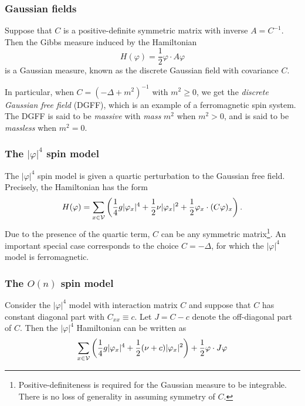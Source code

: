 \subsubsection{Gaussian fields}

Suppose that $C$ is a positive-definite symmetric matrix with inverse $A = C^{-1}$.
Then the Gibbs measure induced by the Hamiltonian
\begin{equation}
H(\varphi) = \frac{1}{2} \varphi \cdot A \varphi
\end{equation}
is a Gaussian measure, known as the discrete Gaussian field with covariance $C$.

In particular, when $C = (-\Delta + m^2)^{-1}$ with $m^2 \ge 0$, we get the \emph{discrete Gaussian
free field} (DGFF), which is an example of a ferromagnetic spin system. The DGFF is said to be
\emph{massive} with \emph{mass} $m^2$ when $m^2 > 0$, and is said to be \emph{massless} when $m^2 = 0$.


\subsubsection{The $|\varphi|^4$ spin model}

The $|\varphi|^4$ spin model is given a quartic perturbation to the Gaussian free field.
Precisely, the Hamiltonian has the form
\begin{equation}
H(\varphi)
  =
\sum_{x\in\mathcal{V}}
\left(
  \frac{1}{4} g |\varphi_x|^4
    +
  \frac{1}{2} \nu |\varphi_x|^2
    +
  \frac{1}{2} \varphi_x \cdot (C \varphi)_x
\right).
\end{equation}
Due to the presence of the quartic term, $C$ can be any symmetric
matrix\footnote{Positive-definiteness is required for the Gaussian measure to be
integrable. There is no loss of generality in assuming symmetry of $C$.}.
An important special case corresponds to the choice $C = -\Delta$, for which
the $|\varphi|^4$ model is ferromagnetic.


\subsubsection{The $O(n)$ spin model}

Consider the $|\varphi|^4$ model with interaction matrix $C$ and suppose that $C$ has
constant diagonal part with $C_{xx} \equiv c$. Let $J = C - c$ denote the off-diagonal
part of $C$. Then the $|\varphi|^4$ Hamiltonian can be written as
\begin{equation}
\sum_{x\in\mathcal{V}}
\left(
  \frac{1}{4} g |\varphi_x|^4
    +
  \frac{1}{2} (\nu + c) |\varphi_x|^2
\right)
  +
\frac{1}{2} \varphi \cdot J \varphi
\end{equation}

